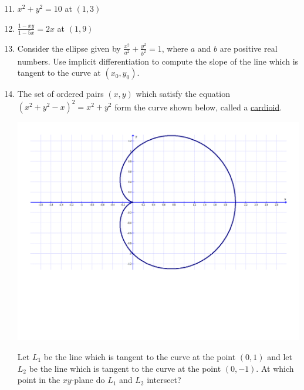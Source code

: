 \documentclass[12pt]{article}
\newif\ifans
\begin{document}
\begin{enumerate}
\setcounter{enumi}{10}

\item $x^2+y^2 = 10$ at $(1,3)$ 

\ifans{\fbox{$y=\frac{-x}{3}+\frac{10}{3}$}} \fi

\item $\frac{1-xy}{1-5x}=2x$ at $(1,9)$ 

\ifans{\fbox{$y=9x$}} \fi

\item Consider the ellipse given by $\frac{x^2}{a^2}+\frac{y^2}{b^2}=1$, where $a$ and $b$ are positive real numbers.  Use implicit differentiation to compute the slope of the line which is tangent to the curve at $(x_0,y_0)$.

\ifans{\fbox{$\left.\frac{dy}{dx}\right|_{(x,y)=(x_0,y_0)}=-\frac{b^2x_0}{a^2y_0}$}} \fi

\item The set of ordered pairs $(x,y)$ which satisfy the equation $(x^2+y^2-x)^2=x^2+y^2$ form the curve shown below, called a \underline{cardioid}.

\begin{center}
\includegraphics[scale=0.5]{cardioid.pdf}
\end{center}

Let $L_1$ be the line which is tangent to the curve at the point $(0,1)$ and let $L_2$ be the line which is tangent to the curve at the point $(0,-1)$.  At which point in the $xy$-plane do $L_1$ and $L_2$ intersect?

\ifans{\fbox{$(-1,0)$}} \fi


\end{enumerate}
\end{document}
